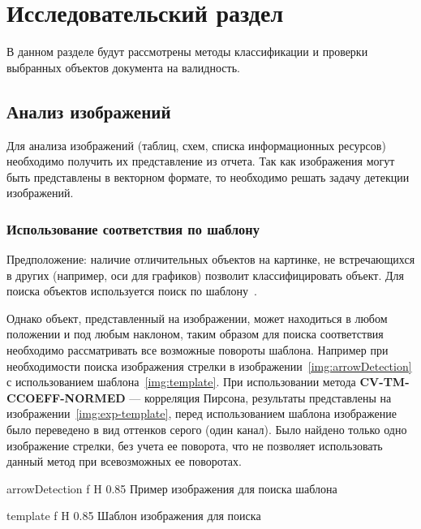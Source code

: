 \chapter{Исследовательский раздел}
В данном разделе будут рассмотрены методы классификации и проверки выбранных объектов документа на валидность.

\section{Анализ изображений}
Для анализа изображений (таблиц, схем, списка информационных ресурсов) необходимо получить их представление из отчета. Так как изображения могут быть представлены
в векторном формате, то необходимо решать задачу детекции изображений. 	

\subsection{Использование соответствия по шаблону}
Предположение: наличие отличительных объектов на картинке, не встречающихся в других (например, оси для графиков) позволит классифицировать объект.
Для поиска объектов используется поиск по шаблону~\cite{pattern_matching}.

Однако объект, представленный на изображении, может находиться в любом положении и под любым наклоном, таким образом для поиска соответствия необходимо 
рассматривать все возможные повороты шаблона. Например при необходимости поиска изображения стрелки в изображении~\ref{img:arrowDetection} с использованием шаблона~\ref{img:template}. При использовании метода \textbf{CV-TM-CCOEFF-NORMED} — корреляция Пирсона, результаты представлены на изображении~\ref{img:exp-template}, перед использованием шаблона изображение было переведено в вид оттенков серого (один канал).
Было найдено только одно изображение стрелки, без учета ее поворота, что не позволяет использовать данный метод при всевозможных ее поворотах.

{arrowDetection} %
{f} %
{H} %
{0.85\textwidth} %
{Пример изображения для поиска шаблона} %


{template} %
{f} %
{H} %
{0.85\textwidth} %
{Шаблон изображения для поиска} %




